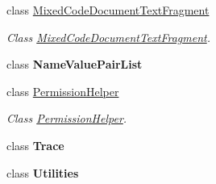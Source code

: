 \begin{DoxyCompactItemize}
class \hyperlink{class_html_agility_pack_1_1_mixed_code_document_text_fragment}{Mixed\+Code\+Document\+Text\+Fragment}
\begin{DoxyCompactList}\small\item\em Class \hyperlink{class_html_agility_pack_1_1_mixed_code_document_text_fragment}{Mixed\+Code\+Document\+Text\+Fragment}. \end{DoxyCompactList}\item 
class {\bfseries Name\+Value\+Pair\+List}
\item 
class \hyperlink{class_html_agility_pack_1_1_permission_helper}{Permission\+Helper}
\begin{DoxyCompactList}\small\item\em Class \hyperlink{class_html_agility_pack_1_1_permission_helper}{Permission\+Helper}. \end{DoxyCompactList}\item 
class {\bfseries Trace}
\item 
class {\bfseries Utilities}
\end{DoxyCompactItemize}
